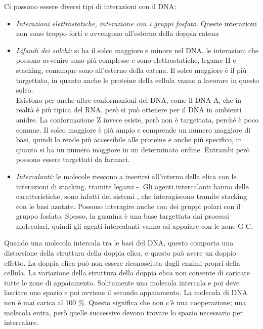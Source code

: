 Ci possono essere diversi tipi di interazioni con il DNA:

\begin{itemize}
\item \emph{Interazioni elettrostatiche, interazione con i gruppi fosfato.} Queste
interazioni non sono troppo forti e avvengono all'esterno della doppia
catena
\item \emph{Lifandi dei solchi:} si ha il solco maggiore e minore nel DNA,
le interazioni che possono avvenire sono più complesse e sono
elettrostatiche, legame H e stacking, comunque sono all'esterno della
catena. Il solco maggiore è il più targettato, in quanto anche le
proteine della cellula vanno a lavorare in questo solco. \\ Esistono per anche altre conformazioni del DNA, come il DNA-A, che in realtà è più
tipica del RNA, però si può ottenere per il DNA in ambienti anidre. La
conformazione Z invece esiste, però non è targettata, perché è poco
comune. Il solco maggiore è più ampio e comprende un numero maggiore di
basi, quindi lo rende più accessibile alle proteine e anche più
specifico, in quanto si ha un numero maggiore in un determinato ordine.
Entrambi però possono essere targettati da farmaci.
\item \emph{Intercalanti:} le molecole riescono a inserirsi all'interno della elica con le interazioni
di stacking, tramite legami \pi-\pi. Gli agenti intercalanti hanno delle
caratteristiche, sono infatti dei sistemi \pi, che interagiscono tramite
stacking con le basi azotate. Possono interagire anche con dei gruppi
polari con il gruppo fosfato. Spesso, la guanina è una base targettata
dai processi molecolari, quindi gli agenti intercalanti vanno ad
appaiare con le zone G-C.
\end{itemize}



Quando una molecola intercala tra le basi del DNA, questo comporta una
distorsione della struttura della doppia elica, e questo può avere un
doppio effetto. La doppia elica può non essere riconosciuta dagli enzimi
propri della cellula. La variazione della struttura della doppia elica
non consente di caricare tutte le zone di appaiamento. Solitamente una
molecola intercala e poi deve lasciare uno spazio e poi avviene il
secondo appaiamento. La molecola di DNA non è mai carica al 100 \%.
Questo significa che non c'è una cooperazione; una molecola entra, però
quelle successive devono trovare lo spazio necessario per intercalare.

